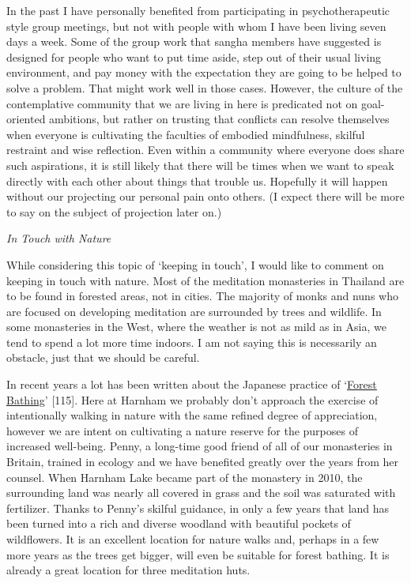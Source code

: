 In the past I have personally benefited from participating in
psychotherapeutic style group meetings, but not with people with whom I
have been living seven days a week. Some of the group work that sangha
members have suggested is designed for people who want to put time
aside, step out of their usual living environment, and pay money with
the expectation they are going to be helped to solve a problem. That
might work well in those cases. However, the culture of the
contemplative community that we are living in here is predicated not on
goal-oriented ambitions, but rather on trusting that conflicts can
resolve themselves when everyone is cultivating the faculties of
embodied mindfulness, skilful restraint and wise reflection. Even within
a community where everyone does share such aspirations, it is still
likely that there will be times when we want to speak directly with each
other about things that trouble us. Hopefully it will happen without our
projecting our personal pain onto others. (I expect there will be more
to say on the subject of projection later on.)

\emph{In Touch with Nature}

While considering this topic of `keeping in touch', I would like to
comment on keeping in touch with nature. Most of the meditation
monasteries in Thailand are to be found in forested areas, not in
cities. The majority of monks and nuns who are focused on developing
meditation are surrounded by trees and wildlife. In some monasteries in
the West, where the weather is not as mild as in Asia, we tend to spend
a lot more time indoors. I am not saying this is necessarily an
obstacle, just that we should be careful.

In recent years a lot has been written about the Japanese practice of
`\href{https://www.theguardian.com/environment/2019/jun/08/forest-bathing-japanese-practice-in-west-wellbeing}{\underline{Forest
Bathing}}' {[}115{]}. Here at Harnham we probably don't approach the
exercise of intentionally walking in nature with the same refined degree
of appreciation, however we are intent on cultivating a nature reserve
for the purposes of increased well-being. Penny, a long-time good friend
of all of our monasteries in Britain, trained in ecology and we have
benefited greatly over the years from her counsel. When Harnham Lake
became part of the monastery in 2010, the surrounding land was nearly
all covered in grass and the soil was saturated with fertilizer. Thanks
to Penny's skilful guidance, in only a few years that land has been
turned into a rich and diverse woodland with beautiful pockets of
wildflowers. It is an excellent location for nature walks and, perhaps
in a few more years as the trees get bigger, will even be suitable for
forest bathing. It is already a great location for three meditation
huts.

